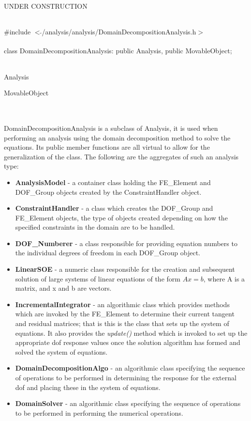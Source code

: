 
UNDER CONSTRUCTION

   \\
\indent \#include $<\tilde{
}$/analysis/analysis/DomainDecompositionAnalysis.h$>$  \\ 

  \\
class DomainDecompositionAnalysis: public Analysis, public MovableObject;  


 \\
Analysis 

MovableObject 

\indent{} \\

 \\ 
\indent DomainDecompositionAnalysis is a subclass of Analysis, 
it is used when performing an analysis using the domain decomposition
method to solve the equations. Its public member functions are all
virtual to allow for the generalization of the 
class. The following are the aggregates of such an analysis type:
\begin{itemize}
\item {\bf AnalysisModel} - a container class holding the FE\_Element
and DOF\_Group objects created by the ConstraintHandler object. 
\item {\bf ConstraintHandler} - a class which creates the DOF\_Group
and FE\_Element objects, the type of objects created depending on how
the specified constraints in the domain are to be handled. 
\item {\bf DOF\_Numberer} - a class responsible for providing equation
numbers to the individual degrees of freedom in each DOF\_Group object.
\item {\bf LinearSOE} - a numeric class responsible for the creation
and subsequent solution of large systems of linear equations of the
form $Ax = b$, where A is a matrix, and x and b are vectors.
\item {\bf IncrementalIntegrator} - an algorithmic class which provides
methods which are invoked by the FE\_Element to determine their
current tangent and residual matrices; that is this is the class that
sets up the system of equations.  It also provides the {\em
update()} method which is invoked to set up the appropriate dof
response values once the solution algorithm has formed and solved the
system of equations.
\item {\bf DomainDecompositionAlgo} - an algorithmic class specifying the
sequence of operations to be performed in determining the response
for the external dof and placing these in the system of equations.
\item {\bf DomainSolver} - an algorithmic class specifying the
sequence of operations to be performed in performing the numerical 
operations.
\end{itemize}


